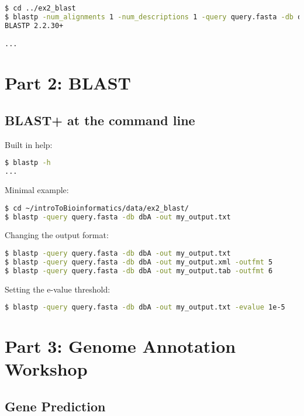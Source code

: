 \documentclass[a4paper]{article}
\begin{document}
\begin{lstlisting}[language=bash]
$ cd ../ex2_blast
$ blastp -num_alignments 1 -num_descriptions 1 -query query.fasta -db dbA
BLASTP 2.2.30+

...
\end{lstlisting}

\section*{Part 2: BLAST}

\subsection*{BLAST+ at the command line}

Built in help:

\begin{lstlisting}[language=bash]
$ blastp -h
...
\end{lstlisting}

\pagebreak

Minimal example:

\begin{lstlisting}[language=bash]
$ cd ~/introToBioinformatics/data/ex2_blast/
$ blastp -query query.fasta -db dbA -out my_output.txt
\end{lstlisting}

Changing the output format:

\begin{lstlisting}[language=bash]
$ blastp -query query.fasta -db dbA -out my_output.txt
$ blastp -query query.fasta -db dbA -out my_output.xml -outfmt 5
$ blastp -query query.fasta -db dbA -out my_output.tab -outfmt 6
\end{lstlisting}

Setting the e-value threshold:

\begin{lstlisting}[language=bash]
$ blastp -query query.fasta -db dbA -out my_output.txt -evalue 1e-5
\end{lstlisting}

\section*{Part 3: Genome Annotation Workshop}

\subsection*{Gene Prediction}
\end{document}
